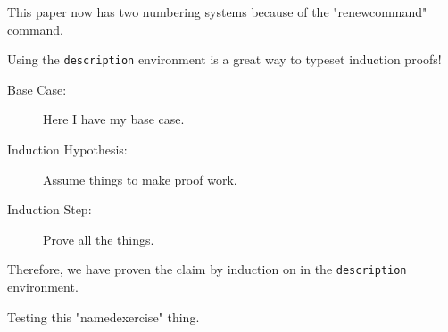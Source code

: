 \documentclass[220a]{homework}
\begin{document}
\begin{numedexercise}
  This paper now has two numbering systems because of the "renewcommand" command.
  
  Using the \texttt{description} environment is a great way to typeset induction proofs!
  \begin{description}
    \item[Base Case:]
      Here I have my base case.
    \item[Induction Hypothesis:]
      Assume things to make proof work. 
    \item[Induction Step:]
      Prove all the things.
  \end{description}

  Therefore, we have proven the claim by induction on in the \texttt{description} environment.
\end{numedexercise}

\begin{namedexercise}
    Testing this "namedexercise" thing.
\end{namedexercise}
\end{document}
